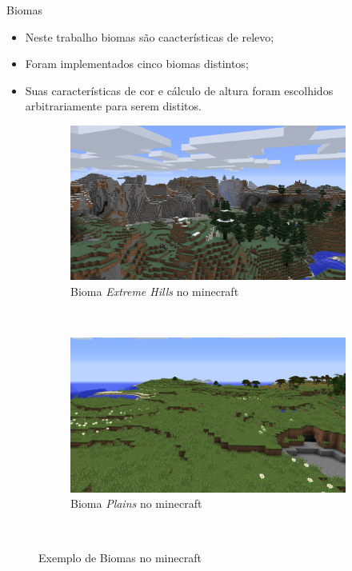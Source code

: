 \begin{frame}{Biomas}
    \begin{itemize} \setlength\itemsep{1em}
        \item Neste trabalho biomas são caacterísticas de relevo;
        \item Foram implementados cinco biomas distintos;
        \item Suas características de cor e cálculo de altura foram escolhidos arbitrariamente
        para serem distitos. 
    \end{itemize}
    \begin{figure}
        \centering
        \begin{subfigure}[b]{0.47\textwidth}
            \includegraphics[width=\textwidth]{img/mineExtremeHills}
            \caption{Bioma \textit{Extreme Hills} no minecraft}
            \label{fig:mineExtremeHills}
        \end{subfigure}
        ~ %
        \begin{subfigure}[b]{0.47\textwidth}
            \includegraphics[width=\textwidth]{img/minePlains}
            \caption{Bioma \textit{Plains} no minecraft}
            \label{fig:minePlains}
        \end{subfigure}
        ~ %
        \caption{Exemplo de Biomas no minecraft}
        \label{fig:mineBiomes}
    \end{figure}
    
    
\end{frame}


